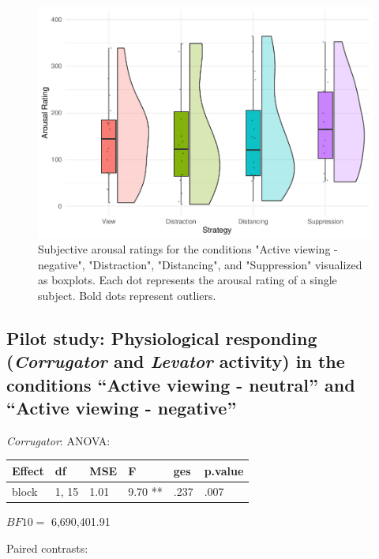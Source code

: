 \documentclass[
  man,floatsintext]{apa6}
\begin{document}
\begin{figure}[H]
\includegraphics[width=0.75\linewidth]{Manuscript_ERED_Stage2_files/figure-latex/FigSubjArousalRegPilot-1} \caption{Subjective arousal ratings for the conditions "Active viewing - negative", "Distraction", "Distancing", and "Suppression" visualized as boxplots. Each dot represents the arousal rating of a single subject. Bold dots represent outliers.}\label{fig:FigSubjArousalRegPilot}
\end{figure}

\hypertarget{pilot-study-physiological-responding-corrugator-and-levator-activity-in-the-conditions-active-viewing---neutral-and-active-viewing---negative}{%
\subsection{\texorpdfstring{Pilot study: Physiological responding (\emph{Corrugator} and \emph{Levator} activity) in the conditions ``Active viewing - neutral'' and ``Active viewing - negative''}{Pilot study: Physiological responding (Corrugator and Levator activity) in the conditions ``Active viewing - neutral'' and ``Active viewing - negative''}}\label{pilot-study-physiological-responding-corrugator-and-levator-activity-in-the-conditions-active-viewing---neutral-and-active-viewing---negative}}

\emph{Corrugator}: ANOVA:

\begin{tabular}{l|l|l|l|l|l}
\hline
Effect & df & MSE & F & ges & p.value\\
\hline
block & 1, 15 & 1.01 & 9.70 ** & .237 & .007\\
\hline
\end{tabular}

\(BF10=\) 6,690,401.91

Paired contrasts:
\end{document}
